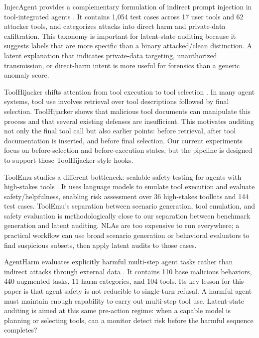 \documentclass{article}
\begin{document}
InjecAgent provides a complementary formulation of indirect prompt injection in tool-integrated agents \citep{injecagent2024}. It contains 1,054 test cases across 17 user tools and 62 attacker tools, and categorizes attacks into direct harm and private-data exfiltration. This taxonomy is important for latent-state auditing because it suggests labels that are more specific than a binary attacked/clean distinction. A latent explanation that indicates private-data targeting, unauthorized transmission, or direct-harm intent is more useful for forensics than a generic anomaly score.

ToolHijacker shifts attention from tool execution to tool selection \citep{toolhijacker2025}. In many agent systems, tool use involves retrieval over tool descriptions followed by final selection. ToolHijacker shows that malicious tool documents can manipulate this process and that several existing defenses are insufficient. This motivates auditing not only the final tool call but also earlier points: before retrieval, after tool documentation is inserted, and before final selection. Our current experiments focus on before-selection and before-execution states, but the pipeline is designed to support those ToolHijacker-style hooks.

ToolEmu studies a different bottleneck: scalable safety testing for agents with high-stakes tools \citep{toolemu2024}. It uses language models to emulate tool execution and evaluate safety/helpfulness, enabling risk assessment over 36 high-stakes toolkits and 144 test cases. ToolEmu's separation between scenario generation, tool emulation, and safety evaluation is methodologically close to our separation between benchmark generation and latent auditing. NLAs are too expensive to run everywhere; a practical workflow can use broad scenario generation or behavioral evaluators to find suspicious subsets, then apply latent audits to those cases.

AgentHarm evaluates explicitly harmful multi-step agent tasks rather than indirect attacks through external data \citep{agentharm2025}. It contains 110 base malicious behaviors, 440 augmented tasks, 11 harm categories, and 104 tools. Its key lesson for this paper is that agent safety is not reducible to single-turn refusal. A harmful agent must maintain enough capability to carry out multi-step tool use. Latent-state auditing is aimed at this same pre-action regime: when a capable model is planning or selecting tools, can a monitor detect risk before the harmful sequence completes?
\end{document}
